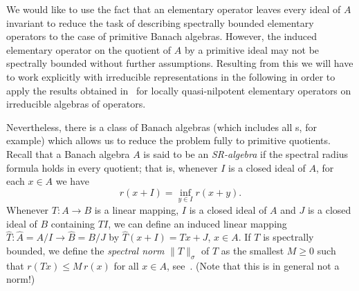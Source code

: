\documentclass[a4paper,12pt,reqno]{amsart}
\numberwithin{equation}{section}
\theoremstyle{definition}
\begin{document}
We would like to use the fact that an elementary operator leaves every ideal of $A$ invariant to reduce
the task of describing spectrally bounded elementary operators to the case of primitive Banach algebras.
However, the induced elementary operator on the quotient of $A$ by a primitive ideal may not be spectrally bounded
without further assumptions. Resulting from this we will have to work explicitly with irreducible representations
in the following in order to apply the results obtained in~\cite{NaMa13} for locally quasi-nilpotent elementary operators on irreducible
algebras of operators.

Nevertheless, there is a class of Banach algebras (which includes all \C*s, for example) which allows us to reduce
the problem fully to primitive quotients. Recall that a Banach algebra $A$ is said to be an \textit{SR-algebra\/}
if the spectral radius formula holds in every quotient; that is, whenever $I$ is a closed ideal of $A$, for each $x\in A$ we have
\begin{equation}\label{eq:spec-rad-form}
r(x+I)=\inf_{y\in I} r(x+y).
\end{equation}
Whenever $T\colon A\to B$ is a linear mapping, $I$ is a closed ideal of $A$ and $J$ is a closed ideal of $B$ containing $TI$,
we can define an induced linear mapping $\hat T\colon\hat A=A/I\to\hat B=B/J$ by $\hat T(x+I)=Tx+J$, $x\in A$.
If $T$ is spectrally bounded, we define the \textit{spectral norm\/} ${{\|{T}\|_\sigma}}$ of $T$ as the smallest $M\geq0$ such that
$r(Tx)\leq M\,r(x)$ for all $x\in A$, see~\cite{MaSc}. (Note that this is in general not a norm!)
\end{document}
